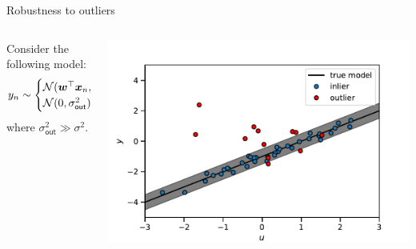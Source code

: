 \documentclass[aspectratio=169]{beamer}
\begin{document}
\begin{frame}{Robustness to outliers}
\begin{columns}
\begin{column}{.5\textwidth}
Consider the following model:
\begin{align*}
    y_n &\sim \begin{cases}
    \mathcal{N}(\boldsymbol{w}^\top \boldsymbol{x}_n, \sigma^2) & \text{with prob } 0.85 \\
    \mathcal{N}(0, \sigma_{\mathsf{out}}^2) & \text{o.w.}
    \end{cases}
\end{align*}
where $\sigma_{\mathsf{out}}^2 \gg \sigma^2$.
\end{column}

\begin{column}{.5\textwidth}
\includegraphics[width=\textwidth]{figures/lap3/data.pdf}
\end{column}

\end{columns}
\end{frame}
\end{document}

